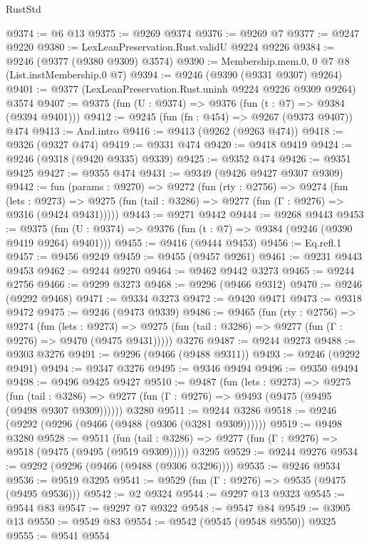 \begin{lexlean}{RustStd}
\begin{coremodule}
{\begin{coremodule}
{{{{{{{{{{{{{{{{{{{{{{{{{{{{{{{{{@9374 := @6 @13
@9375 := @9269 @9374
@9376 := @9269 @7
@9377 := @9247 @9220
@9380 := LexLeanPreservation.Rust.validU @9224 @9226
@9384 := @9246 (@9377 (@9380 @9309) @3574)
@9390 := Membership.mem.{0, 0} @7 @8 (List.instMembership.{0} @7)
@9394 := @9246 (@9390 (@9331 @9307) @9264)
@9401 := @9377 (LexLeanPreservation.Rust.uninh @9224 @9226 @9309 @9264) @3574
@9407 := @9375 (fun (U : @9374) => @9376 (fun (t : @7) => @9384 (@9394 @9401)))
@9412 := @9245 (fun (fn : @454) => @9267 (@9373 @9407)) @474
@9413 := And.intro
@9416 := @9413 (@9262 (@9263 @474))
@9418 := @9326 (@9327 @474)
@9419 := @9331 @474
@9420 := @9418 @9419
@9424 := @9246 (@9318 (@9420 @9335) @9339)
@9425 := @9352 @474
@9426 := @9351 @9425
@9427 := @9355 @474
@9431 := @9349 (@9426 @9427 @9307 @9309)
@9442 := fun (params : @9270) =>
  @9272
    (fun (rty : @2756) =>
    @9274
      (fun (lets : @9273) =>
      @9275 (fun (tail : @3286) => @9277 (fun (Γ : @9276) => @9316 (@9424 @9431)))))
@9443 := @9271 @9442
@9444 := @9268 @9443
@9453 := @9375 (fun (U : @9374) => @9376 (fun (t : @7) => @9384 (@9246 (@9390 @9419 @9264) @9401)))
@9455 := @9416 (@9444 @9453)
@9456 := Eq.refl.{1}
@9457 := @9456 @9249
@9459 := @9455 (@9457 @9261)
@9461 := @9231 @9443 @9453
@9462 := @9244 @9270
@9464 := @9462 @9442 @3273
@9465 := @9244 @2756
@9466 := @9299 @3273
@9468 := @9296 (@9466 @9312)
@9470 := @9246 (@9292 @9468)
@9471 := @9334 @3273
@9472 := @9420 @9471
@9473 := @9318 @9472
@9475 := @9246 (@9473 @9339)
@9486 := @9465
    (fun (rty : @2756) =>
    @9274
      (fun (lets : @9273) =>
      @9275 (fun (tail : @3286) => @9277 (fun (Γ : @9276) => @9470 (@9475 @9431)))))
    @3276
@9487 := @9244 @9273
@9488 := @9303 @3276
@9491 := @9296 (@9466 (@9488 @9311))
@9493 := @9246 (@9292 @9491)
@9494 := @9347 @3276
@9495 := @9346 @9494
@9496 := @9350 @9494
@9498 := @9496 @9425 @9427
@9510 := @9487
    (fun (lets : @9273) =>
    @9275
      (fun (tail : @3286) => @9277 (fun (Γ : @9276) => @9493 (@9475 (@9495 (@9498 @9307 @9309))))))
    @3280
@9511 := @9244 @3286
@9518 := @9246 (@9292 (@9296 (@9466 (@9488 (@9306 (@3281 @9309))))))
@9519 := @9498 @3280
@9528 := @9511
    (fun (tail : @3286) => @9277 (fun (Γ : @9276) => @9518 (@9475 (@9495 (@9519 @9309)))))
    @3295
@9529 := @9244 @9276
@9534 := @9292 (@9296 (@9466 (@9488 (@9306 @3296))))
@9535 := @9246 @9534
@9536 := @9519 @3295
@9541 := @9529 (fun (Γ : @9276) => @9535 (@9475 (@9495 @9536)))
@9542 := @2 @9324
@9544 := @9297 @13 @9323
@9545 := @9544 @83
@9547 := @9297 @7 @9322
@9548 := @9547 @84
@9549 := @3905 @13
@9550 := @9549 @83
@9554 := @9542 (@9545 (@9548 @9550)) @9325
@9555 := @9541 @9554
}}}}}}}}}}}}}}}}}}}}}}}}}}}}}}}}}
\end{coremodule}}
\end{coremodule}
\end{lexlean}
